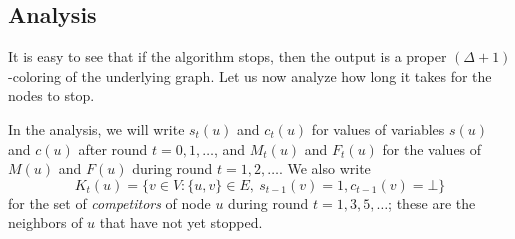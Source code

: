 \subsection{Analysis}

It is easy to see that if the algorithm stops, then the output is a proper ${(\Delta+1)}$-coloring of the underlying graph. Let us now analyze how long it takes for the nodes to stop.

In the analysis, we will write $s_t(u)$ and $c_t(u)$ for values of variables $s(u)$ and $c(u)$ after round $t = 0,1,\dotsc$, and $M_t(u)$ and $F_t(u)$ for the values of $M(u)$ and $F(u)$ during round $t=1,2,\dotsc$. We also write
\[
    K_t(u) = \bigl\{ v \in V : \{u,v\} \in E,\ s_{t-1}(v) = 1, c_{t-1}(v) = \bot \bigr\}
\]
for the set of \emph{competitors} of node $u$ during round $t = 1,3,5,\dotsc$; these are the neighbors of $u$ that have not yet stopped.

